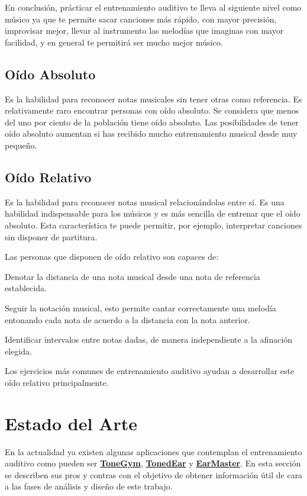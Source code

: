 \documentclass[12pt,twoside,titlepage]{report}
\begin{document}
En conclusión, prácticar el entrenamiento auditivo te lleva al siguiente nivel como músico ya que te permite sacar canciones más rápido, con mayor precisión, improvisar mejor, llevar al instrumento las melodías que imaginas con mayor facilidad, y en general te permitirá ser mucho mejor músico.
\cite{entrenamientoAutitivo2}

\subsection{Oído Absoluto}

Es la habilidad para reconocer notas musicales sin tener otras como referencia. Es relativamente raro encontrar personas con oído absoluto. Se considera que menos del uno por ciento de la población tiene oído absoluto. Las posibilidades de tener oído absoluto aumentan si has recibido mucho entrenamiento musical desde muy pequeño.
\cite{oidoAbsRel}
\subsection{Oído Relativo}

Es la habilidad para reconocer notas musical relacionándolas entre sí. Es una habilidad indispensable para los músicos y es más sencilla de entrenar que el oído absoluto. Esta característica te puede permitir, por ejemplo, interpretar canciones sin disponer de partitura.

Las personas que disponen de oído relativo son capaces de:
\begin{compactitem}
    \item Denotar la distancia de una nota musical desde una nota de referencia establecida.
    \item Seguir la notación musical, esto permite cantar correctamente una melodía entonando cada nota de acuerdo a la distancia con la nota anterior.
    \item Identificar intervalos entre notas dadas, de manera independiente a la afinación elegida.
\end{compactitem}

Los ejercicios más comunes de entrenamiento auditivo ayudan a desarrollar este oído relativo principalmente.
\cite{oidoAbsRel}

\section{Estado del Arte}

En la actualidad ya existen algunas aplicaciones que contemplan el entrenamiento auditivo como pueden ser \hyperref[sec:ToneGym]{\textbf{ToneGym}}, \hyperref[sec:TonedEar]{\textbf{TonedEar}} y \hyperref[sec:EarMaster]{\textbf{EarMaster}}. En esta sección se describen sus pros y contras con el objetivo de obtener información útil de cara a las fases de análisis y diseño de este trabajo.
\end{document}
